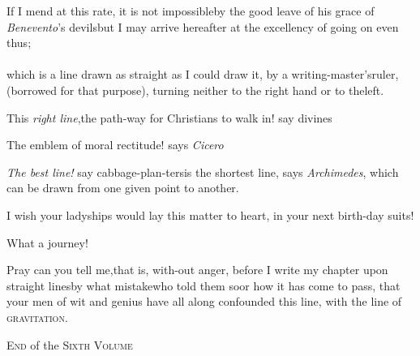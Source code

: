 \documentclass{article}
\begin{document}
If I mend at this rate, it is not impossible\tsh by the
good leave of his grace of \textit{Benevento}’s
devils\tsh but I may arrive hereafter at the excellency of\break
going on even thus;\\[10pt]
\\[10pt]
which is a line drawn as straight as I could draw
it, by a writing-master’s\break ruler, (borrowed for that purpose),
turning neither to the right hand or to the\break left.

\newpage
This \textit{right line},\tsk the path-way for Christians to
walk in! say divines\tsh

\tsh The emblem of moral rectitude! says
\textit{Cicero}\tsh

\tsh \textit{The best line!} say cabbage-plan-\break ters\tsh is the shortest line,
says \textit{Archi\-medes},
which can be drawn from one given point to
another.\tsh

I wish your ladyships would lay this matter to heart, in your
next birth-\break day suits!

\tsh What a journey!

Pray can you tell me,\tsk that is, with-\break out anger, before I
write my chapter upon straight lines\tsh by what
mistake\tsh who told them so\tsh or how it has
come to pass, that your men of wit and genius have all along
confounded this line, with the line of
\textsc{gravitation}.

\bigskip
\centerline{\textsc{End} of the \textsc{Sixth Volume}}
\end{document}
